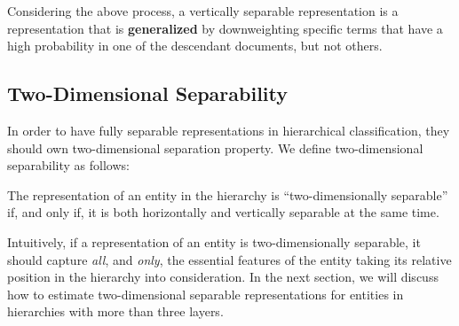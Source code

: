 Considering the above process, a vertically separable representation is a representation that is \textbf{generalized} by downweighting specific terms that have a high probability in one of the descendant documents, but not others.  

\subsection{Two-Dimensional Separability}
In order to have fully separable representations in hierarchical classification, they should own two-dimensional separation property. We define two-dimensional separability as follows:
\begin{mydef}
The representation of an entity in the hierarchy is ``two-dimensionally separable'' if, and only if, it is both horizontally and vertically separable at the same time.
\end{mydef}

Intuitively, if a representation of an entity is two-dimensionally separable, it should capture \emph{all}, and \emph{only}, the essential features of the entity taking its relative position in the hierarchy into consideration.  In the next section, we will discuss how to estimate two-dimensional separable representations for entities in hierarchies with more than three layers.

